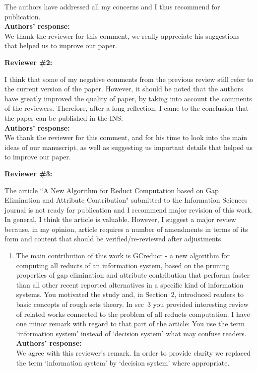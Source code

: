 \documentclass{letter}
\begin{document}
\begin{letter}{}
  The authors have addressed all my concerns and I thus recommend for publication.\\
  \textbf{Authors’ response:} \\
  We thank the reviewer for this comment, we really appreciate his suggestions that helped us to improve our paper.
  
  \textbf{Reviewer \#2:}
  
  I think that some of my negative comments from the previous review still refer to the current version of the paper. However, it should be noted that the authors have greatly improved the quality of paper, by taking into account the comments of the reviewers. Therefore, after a long reflection, I came to the conclusion that the paper can be published in the INS.\\
  \textbf{Authors’ response:} \\
  We thank the reviewer for this comment, and for his time to look into the main ideas of our manuscript, as well as suggesting us important details that helped us to improve our paper.
  
  \textbf{Reviewer \#3:}
  
  The article ``A New Algorithm for Reduct Computation based on Gap Elimination and Attribute Contribution" submitted to the Information Sciences journal is not ready for publication and I recommend major revision of this work. In general, I think the article is valuable. However, I suggest a major review because, in my opinion, article requires a number of amendments in terms of its form and content that should be verified/re-reviewed after adjustments.
 
 \begin{enumerate}  
	\item The main contribution of this work is GCreduct - a new algorithm for computing all reducts of an information system, based on the pruning properties of gap elimination and attribute contribution that performs faster than all other recent reported alternatives in a specific kind of information systems. You motivated the study and, in Section~2, introduced readers to basic concepts of rough sets theory. In sec~3 you provided interesting review of related works connected to the problem of all reducts computation. I have one minor remark with regard to that part of the article: You use the term `information system' instead of `decision system' what may confuse readers.\\
	\textbf{Authors’ response:} \\
	We agree with this reviewer's remark. In order to provide clarity we replaced the term `information system' by `decision system' where appropriate.
	

\end{enumerate}
\end{letter}
\end{document}
